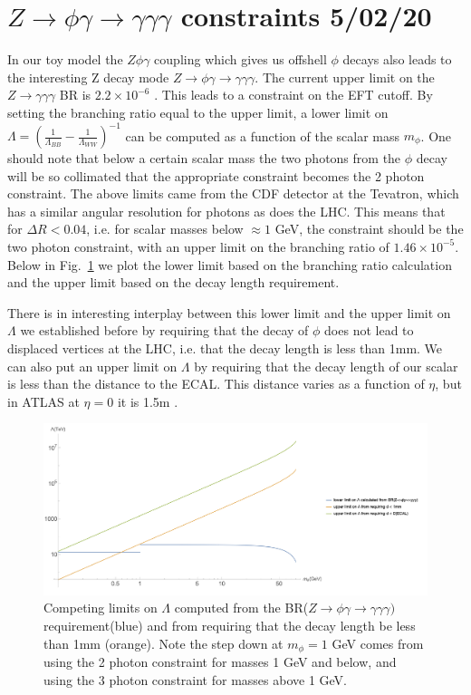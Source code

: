 \documentclass[aps,onecolumn,twoside,secnumarabic,balancelastpage,amsmath,amssymb,nofootinbib,hyperref=pdftex]{revtex4}
\begin{document}
\section{$Z\rightarrow \phi\gamma \rightarrow \gamma\gamma\gamma$ constraints \tiny{5/02/20}}
In our toy model the $Z\phi\gamma$ coupling which gives us offshell $\phi$ decays also leads to the interesting Z decay mode $Z\rightarrow \phi\gamma \rightarrow \gamma\gamma\gamma$. The current upper limit on the $Z\rightarrow \gamma\gamma\gamma$ BR is $2.2\times10^{-6}$ \cite{PDG}. This leads to a constraint on the EFT cutoff. By setting the branching ratio equal to the upper limit, a lower limit on $\Lambda = (\frac{1}{\Lambda_{BB}} - \frac{1}{\Lambda_{WW}})^{-1}$ can be computed as a function of the scalar mass $m_{\phi}$. 
\vskip 0.12in
One should note that below a certain scalar mass the two photons from the $\phi$ decay will be so collimated that the appropriate constraint becomes the 2 photon constraint. The above limits came from the CDF detector at the Tevatron, which has a similar angular resolution for photons as does the LHC\cite{Aaltonen:2012jd}. This means that for $\Delta R < 0.04$, i.e. for scalar masses below $\approx 1$ GeV, the constraint should be the two photon constraint, with an upper limit on the branching ratio of $1.46\times 10^{-5}$. Below in Fig.~\ref{fig:BR_vs_D} we plot the lower limit based on the branching ratio calculation and the upper limit based on the decay length requirement. 

There is in interesting interplay between this lower limit and the upper limit on $\Lambda$ we established before by requiring that the decay of $\phi$ does not lead to displaced vertices at the LHC, i.e. that the decay length is less than 1mm. We can also put an upper limit on $\Lambda$ by requiring that the decay length of our scalar is less than the distance to the ECAL. This distance varies as a function of $\eta$, but in ATLAS at $\eta = 0$ it is 1.5m \cite{eta_ATLAS}.

\begin{figure}[htp]
\begin{center}
\includegraphics[width=13cm]{BR_vs_D.png}
\caption{Competing limits on $\Lambda$ computed from the  BR($Z\rightarrow \phi\gamma \rightarrow \gamma\gamma\gamma)$ requirement(blue) and from requiring that the decay length be less than 1mm (orange). Note the step down at $m_{\phi} = 1$ GeV comes from using the 2 photon constraint for masses 1 GeV and below, and using the 3 photon constraint for masses above 1 GeV.}
\label{fig:BR_vs_D}
\end{center}
\end{figure}
\end{document}
